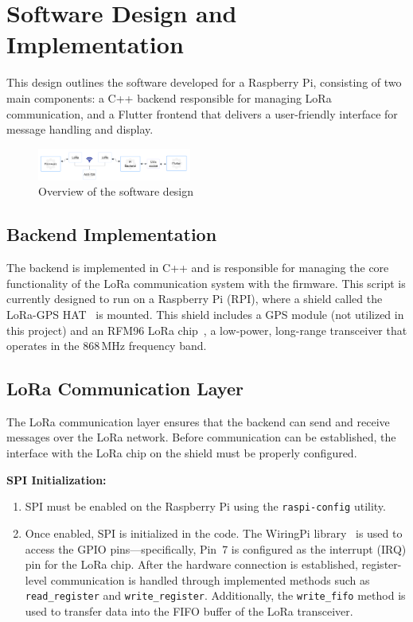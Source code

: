 \section{Software Design and Implementation}

This design outlines the software developed for a Raspberry Pi, consisting of two main components: a C++ backend responsible for managing LoRa communication, and a Flutter frontend that delivers a user-friendly interface for message handling and display.

\begin{figure}[H]
\centering
\includegraphics[width=0.45\textwidth]{images/lora-shield.png}
\caption{Overview of the software design}\label{fig:lora-shield}
\end{figure}

\subsection{Backend Implementation}

The backend is implemented in C++ and is responsible for managing the core functionality of the LoRa communication system with the firmware. 
This script is currently designed to run on a Raspberry Pi (RPI), where a shield called the LoRa-GPS HAT~\cite{LoRa-GPS-HAT} is mounted. 
This shield includes a GPS module (not utilized in this project) and an RFM96 LoRa chip~\cite{LoRa module}, a low-power, 
long-range transceiver that operates in the 868\,MHz frequency band.

\subsection{LoRa Communication Layer}

The LoRa communication layer ensures that the backend can send and receive messages over the LoRa network.
Before communication can be established, the interface with the LoRa chip on the shield must be properly configured.

\textbf{SPI Initialization:}

\begin{enumerate}
  \item SPI must be enabled on the Raspberry Pi using the \texttt{raspi-config} utility.
  \item Once enabled, SPI is initialized in the code. The WiringPi library~\cite{WiringPi} is used to access the GPIO pins—specifically, 
  Pin~7 is configured as the interrupt (IRQ) pin for the LoRa chip. After the hardware connection is established, register-level communication is handled through implemented methods such as \texttt{read\_register} and \texttt{write\_register}. Additionally, the \texttt{write\_fifo} method is used to transfer data into the FIFO buffer of the LoRa transceiver.
\end{enumerate}

